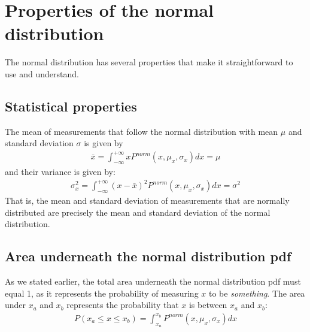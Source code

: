 \section{Properties of the normal distribution}
The normal distribution has several properties that make it straightforward to use and understand.
\subsection{Statistical properties}
The mean of measurements that follow the normal distribution with mean $\mu$ and standard deviation $\sigma$ is given by
\begin{align}
\bar x = \int_{-\infty}^{+\infty}xP^{norm}(x,\mu_x,\sigma_x)dx=\mu
\end{align}
and their variance is given by:
\begin{align}
\sigma_x^2 = \int_{-\infty}^{+\infty}(x-\bar x)^2P^{norm}(x,\mu_x,\sigma_x)dx=\sigma^2
\end{align}
That is, the mean and standard deviation of measurements that are normally distributed are precisely the mean and standard deviation of the normal distribution.

\subsection{Area underneath the normal distribution pdf}
As we stated earlier, the total area underneath the normal distribution pdf must equal 1, as it represents the probability of measuring $x$ to be \textit{something}. The area under $x_a$ and $x_b$ represents the probability that $x$ is between $x_a$ and $x_b$:
\begin{align}
P(x_a \leq x \leq x_b) = \int_{x_a}^{x_b}P^{norm}(x,\mu_x,\sigma_x)dx
\end{align}

